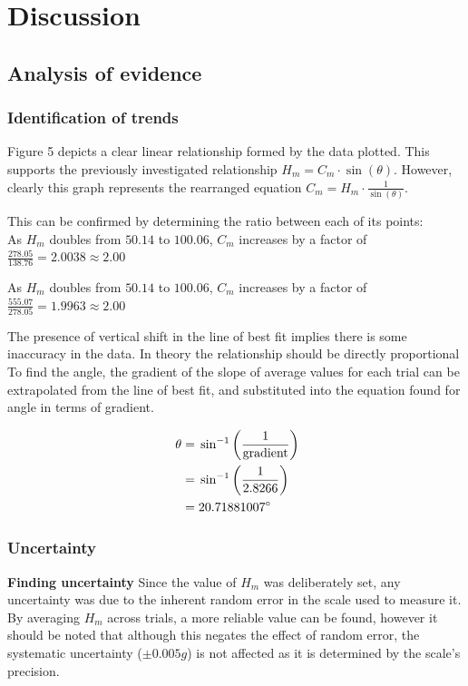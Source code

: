 \documentclass[11pt,a4paper]{article}
\begin{document}
\section{Discussion}
\subsection{Analysis of evidence}
\subsubsection{Identification of trends}
Figure 5 depicts a clear linear relationship formed by the data plotted. This supports the previously investigated relationship  $H_m=C_m\cdot{\sin(\theta)}$. However, clearly this graph represents the rearranged equation $C_m=H_m\cdot \frac{1}{{\sin(\theta)}}$.


This can be confirmed by determining the ratio between each of its points:
\\

As $H_m$ doubles from $50.14$ to $100.06$, $C_m$ increases by a factor of $\frac{278.05}{138.76}=2.0038\approx2.00$

As $H_m$ doubles from $50.14$ to $100.06$, $C_m$ increases by a factor of $\frac{555.07}{278.05}=1.9963\approx2.00$

\hfill

The presence of vertical shift in the line of best fit implies there is some inaccuracy in the data. In theory the relationship should be directly proportional
To find the angle, the gradient of the slope of average values for each trial can be extrapolated from the line of best fit, and substituted into the equation found for angle in terms of gradient.

\begin{align*}
\centering
\;\theta=&\;\sin^{-1}\left(\frac{1}{\textrm{gradient}}\right)\\
 =& \;\sin^{-1}\left(\frac{1}{2.8266}\right)\\
	=&\;20.71881007^\circ
\end{align*}

\subsubsection{Uncertainty}

{\large \textbf{Finding uncertainty}\newline}
Since the value of $H_m$ was deliberately set, any uncertainty was due to the inherent random error in the scale used to measure it. By averaging $H_m$ across trials, a more reliable value can be found, however it should be noted that although this negates the effect of random error, the systematic uncertainty ($\pm0.005g$) is not affected as it is determined by the scale's precision.
\end{document}
